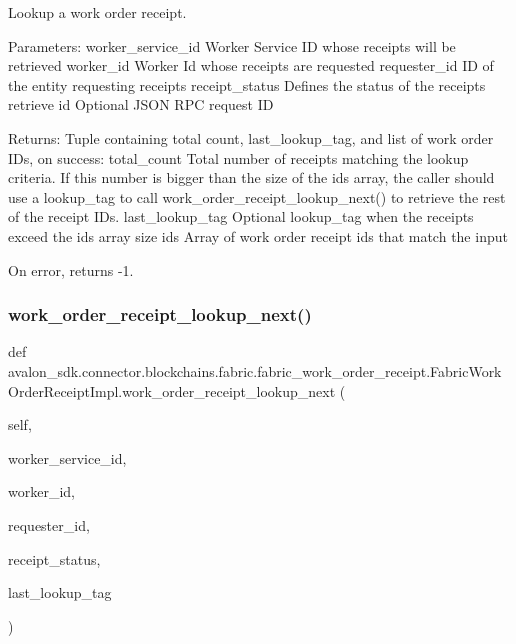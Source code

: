 \begin{DoxyVerb}Lookup a work order receipt.

Parameters:
worker_service_id Worker Service ID whose receipts will be
          retrieved
worker_id         Worker Id whose receipts are requested
requester_id      ID of the entity requesting receipts
receipt_status    Defines the status of the receipts retrieve
id                Optional JSON RPC request ID

Returns:
Tuple containing total count, last_lookup_tag, and
list of work order IDs, on success:
total_count     Total number of receipts matching the lookup criteria.
        If this number is bigger than the size of the ids
        array, the caller should use a lookup_tag to call
        work_order_receipt_lookup_next() to retrieve the rest
        of the receipt IDs.
last_lookup_tag Optional lookup_tag when the receipts exceed the ids
        array size
ids             Array of work order receipt ids that match the input

On error, returns -1.
\end{DoxyVerb}
 \mbox{\label{classavalon__sdk_1_1connector_1_1blockchains_1_1fabric_1_1fabric__work__order__receipt_1_1FabricWorkOrderReceiptImpl_a559c919a4a124991398d727c0a16f234}} 
\subsubsection{\texorpdfstring{work\+\_\+order\+\_\+receipt\+\_\+lookup\+\_\+next()}{work\_order\_receipt\_lookup\_next()}}
{\footnotesize\ttfamily def avalon\+\_\+sdk.\+connector.\+blockchains.\+fabric.\+fabric\+\_\+work\+\_\+order\+\_\+receipt.\+Fabric\+Work\+Order\+Receipt\+Impl.\+work\+\_\+order\+\_\+receipt\+\_\+lookup\+\_\+next (\begin{DoxyParamCaption}\item[{}]{self,  }\item[{}]{worker\+\_\+service\+\_\+id,  }\item[{}]{worker\+\_\+id,  }\item[{}]{requester\+\_\+id,  }\item[{}]{receipt\+\_\+status,  }\item[{}]{last\+\_\+lookup\+\_\+tag }\end{DoxyParamCaption})}

